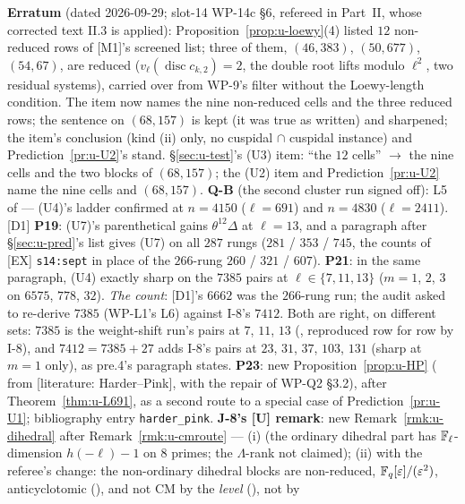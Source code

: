 \documentclass[11pt]{article}
\newcommand{\LIT}[1]{\textsf{[literature: #1]}}   %
\newcommand{\Iw}{\Lambda}                         %
\begin{document}
\textbf{Erratum} (dated 2026-09-29; slot-14 WP-14c \S6, refereed in  Part~II, whose
corrected text II.3 is applied): Proposition~\ref{prop:u-loewy}(4) listed $12$ non-reduced rows of [M1]'s screened list; three of them,
$(46,383)$, $(50,677)$, $(54,67)$, are reduced ($v_\ell(\operatorname{disc}c_{k,2})=2$, the double root lifts modulo $\ell^{2}$, two residual systems),
carried over from WP-9's filter without the Loewy-length condition. The item now names the nine non-reduced cells and the three reduced rows; the
sentence on $(68,157)$ is kept (it was true as written) and sharpened; the item's conclusion (kind (ii) only, no cuspidal $\cap$ cuspidal instance) and
Prediction~\ref{pr:u-U2}'s stand. \S\ref{sec:u-test}'s (U3) item: ``the $12$ cells'' $\to$ the nine cells and the two blocks of $(68,157)$; the (U2)
item and Prediction~\ref{pr:u-U2} name the nine cells and $(68,157)$. \textbf{Q-B} (the second cluster run signed off): L5 of
 --- (U4)'s ladder confirmed at $n=4150$ ($\ell=691$) and $n=4830$ ($\ell=2411$). [D1] \textbf{P19}: (U7)'s
parenthetical gains $\theta^{12}\Delta$ at $\ell=13$, and a \COMP{} paragraph after \S\ref{sec:u-pred}'s list gives (U7) on all $287$ rungs
($281$ / $353$ / $745$, the counts of [EX] \texttt{s14:sept} in place of the $266$-rung $260$ / $321$ / $607$). \textbf{P21}: in the same paragraph,
(U4) exactly sharp on the $7385$ pairs at $\ell\in\{7,11,13\}$ ($m=1$, $2$, $3$ on $6575$, $778$, $32$). \emph{The count}: [D1]'s $6662$ was the $266$-rung
run; the audit asked to re-derive $7385$ (WP-L1's L6) against I-8's $7412$. Both are right, on different sets: $7385$ is the weight-shift run's
pairs at $7$, $11$, $13$ (, reproduced row for row by I-8), and $7412=7385+27$ adds I-8's pairs at $23$, $31$,
$37$, $103$, $131$ (sharp at $m=1$ only), as pre.4's paragraph states. \textbf{P23}: new Proposition~\ref{prop:u-HP} (\PROVED{} from \LIT{Harder--Pink},
with the repair of WP-Q2 \S3.2), after Theorem~\ref{thm:u-L691}, as a second route to a special case of Prediction~\ref{pr:u-U1}; bibliography
entry \texttt{harder\_pink}. \textbf{J-8's [U] remark}: new Remark~\ref{rmk:u-dihedral} after Remark~\ref{rmk:u-cmroute} --- (i) \COMP{} (the
ordinary dihedral part has $\mathbb{F}_\ell$-dimension $h(-\ell)-1$ on $8$ primes; the $\Iw$-rank not claimed); (ii) with the referee's change: the non-ordinary
dihedral blocks are non-reduced, $\mathbb{F}_q[\varepsilon]/(\varepsilon^{2})$, anticyclotomic (\COMP), and not CM by the \emph{level} (\STD{}), not by
\end{document}
